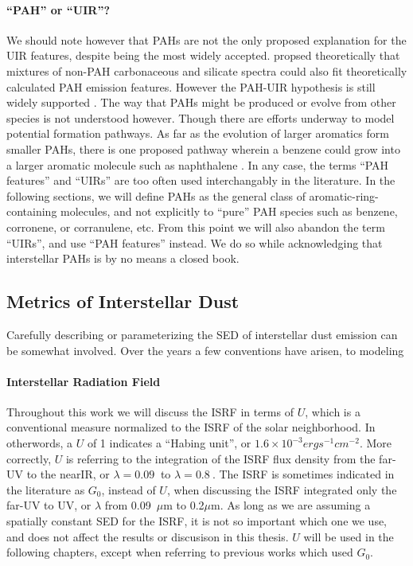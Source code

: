     \paragraph{``PAH'' or ``UIR''?}
      We should note however that PAHs are not the only proposed explanation for the UIR features, despite being the most widely accepted. \cite{zhang14} propsed theoretically that mixtures of non-PAH carbonaceous and silicate spectra could also fit theoretically calculated PAH emission features. However the PAH-UIR hypothesis is still widely supported \citep{tielens08,rastogi13}.  The way that PAHs might be produced or evolve from other species is not understood however. Though there are efforts underway to model potential formation pathways. As far as the evolution of larger aromatics form smaller PAHs, there is one proposed pathway wherein a benzene could grow into a larger aromatic molecule such as naphthalene \citep{ghesquiere14}. In any case, the terms ``PAH features'' and ``UIRs'' are too often used interchangably in the literature. In the following sections, we will define PAHs as the general class of aromatic-ring-containing molecules, and not explicitly to ``pure'' PAH species such as benzene, corronene, or corranulene, etc. From this point we will also abandon the term ``UIRs'', and use ``PAH features'' instead. We do so while acknowledging that interstellar PAHs is by no means a closed book.



     \subsection{Metrics of Interstellar Dust}
      Carefully describing or parameterizing the SED of interstellar dust emission can be somewhat involved. Over the years a few conventions have arisen, to modeling

      \paragraph{Interstellar Radiation Field}
      Throughout this work we will discuss the ISRF in terms of $U$, which is a conventional measure normalized to the ISRF of the solar neighborhood. In otherwords, a $U$ of 1 indicates a ``Habing unit'', or $1.6\times{}10^{-3} erg s^{-1} cm^{-2}$. More correctly, $U$ is referring to the integration of the ISRF flux density from the far-UV to the nearIR, or $\lambda =0.09~$ to $\lambda =0.8~$.  The ISRF is sometimes indicated in the literature as $G_0$, instead of $U$, when discussing the ISRF integrated only the far-UV to UV, or $\lambda$ from 0.09~$\mu$m to 0.2$\mu$m. As long as we are assuming a spatially constant SED for the ISRF, it is not so important which one we use, and does not affect the results or discusison in this thesis. $U$ will be used in the following chapters, except when referring to previous works which used $G_0$.

